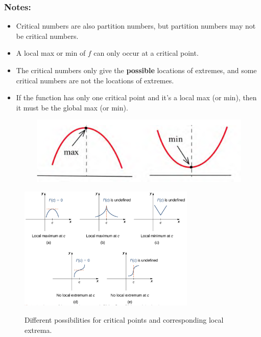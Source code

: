 \subsubsection*{Notes:}
\begin{itemize}
    \item Critical numbers are also partition numbers, but partition numbers may not be critical numbers.
    \item A local max or min of $f$ can only occur at a critical point.
    \item The critical numbers only give the \textbf{possible} locations of extremes, and some critical numbers are not the locations of extremes.
    \item If the function has only one critical point and it’s a local max (or min), then it must be the global max (or min). 
    \begin{figure}[h]
    \centering
    \caption{} 
    \includegraphics[scale=0.45]{images/optimization/oneLocalExtrema.png} 
    \label{fig:oneLocalExtrema}
\end{figure}
    
\end{itemize}
\begin{figure}[h]
\centering
    \caption{Different possibilities for critical points and corresponding local extrema.} 
    \includegraphics[width=0.75\textwidth]{images/optimization/critLocalExtreme.png}\footnotemark[1]
    \label{fig:critLocalExtreme}
\end{figure}

